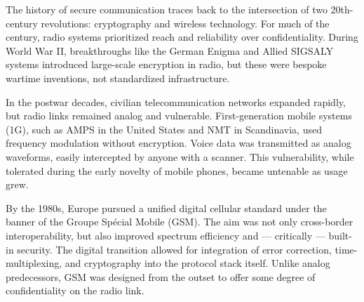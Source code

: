 \begin{historical}
The history of secure communication traces back to the intersection of two 20th-century revolutions: cryptography and wireless technology. For much of the century, radio systems prioritized reach and reliability over confidentiality. During World War II, breakthroughs like the German Enigma and Allied SIGSALY systems introduced large-scale encryption in radio, but these were bespoke wartime inventions, not standardized infrastructure.

In the postwar decades, civilian telecommunication networks expanded rapidly, but radio links remained analog and vulnerable. First-generation mobile systems (1G), such as AMPS in the United States and NMT in Scandinavia, used frequency modulation without encryption. Voice data was transmitted as analog waveforms, easily intercepted by anyone with a scanner. This vulnerability, while tolerated during the early novelty of mobile phones, became untenable as usage grew.

By the 1980s, Europe pursued a unified digital cellular standard under the banner of the Groupe Spécial Mobile (GSM). The aim was not only cross-border interoperability, but also improved spectrum efficiency and — critically — built-in security. The digital transition allowed for integration of error correction, time-multiplexing, and cryptography into the protocol stack itself. Unlike analog predecessors, GSM was designed from the outset to offer some degree of confidentiality on the radio link.
\end{historical}
